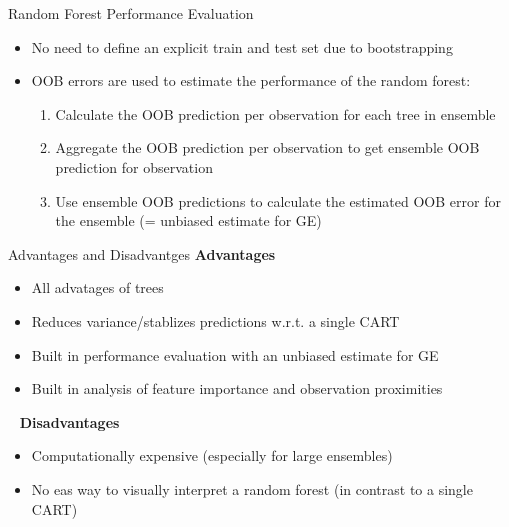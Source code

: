\begin{vbframe}{Random Forest Performance Evaluation}
\begin{itemize}
  \item No need to define an explicit train and test set due to bootstrapping 
  \item OOB errors are used to estimate the performance of the random forest: 
  \begin{enumerate}
    \item Calculate the OOB prediction per observation for each tree in ensemble 
    \item Aggregate the OOB prediction per observation to get ensemble OOB prediction for observation
    \item Use ensemble OOB predictions to calculate the estimated OOB error for the ensemble (= unbiased estimate for GE) 
  \end{enumerate}
\end{itemize}
\end{vbframe}


\begin{vbframe}{Advantages and Disadvantges}
\textbf{Advantages}
\begin{itemize}
  \item All advatages of trees
  \item Reduces variance/stablizes predictions w.r.t. a single CART
  \item Built in performance evaluation with an unbiased estimate for GE
  \item Built in analysis of feature importance and observation proximities
\end{itemize}
\ \newline
\textbf{Disadvantages}
\begin{itemize}
  \item Computationally expensive (especially for large ensembles) 
  \item No eas way to visually interpret a random forest (in contrast to a single CART) 
\end{itemize}
\end{vbframe}


\endlecture

